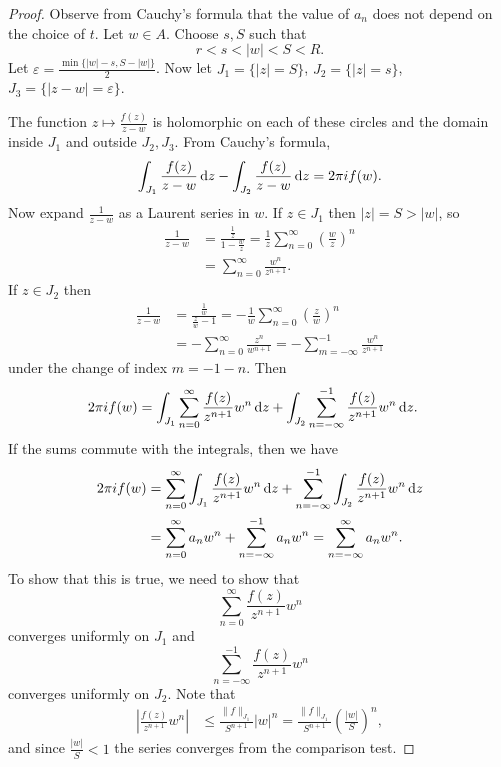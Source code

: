 \begin{proof}
Observe from Cauchy's formula
that the value of $a_n$ does not depend on the choice of $t$.
Let $w \in A$. Choose $s, S$ such that
$$
r < s < |w| < S < R.
$$
Let $\varepsilon = \frac{\min \{ |w| - s, S - |w| \}}{2}$.
Now let $J_1 = \{ |z| = S \}$, $J_2 = \{ |z| = s \}$,
$J_3 = \{ |z - w| = \varepsilon \}$.

The function $z \mapsto \frac{f(z)}{z - w}$ is holomorphic
on each of these circles and the domain inside $J_1$
and outside $J_2, J_3$. From Cauchy's formula,
$$
  \int_{J_1}
    \frac{f(z)}
         {z - w}
    \mathop{}\!\mathrm{d} z
- \int_{J_2}
    \frac{f(z)}
         {z - w}
    \mathop{}\!\mathrm{d} z
= 2 \pi i f(w).
$$
Now expand $\frac{1}{z - w}$ as a Laurent series
in $w$. If $z \in J_1$ then $|z| = S > |w|$, so
\begin{align*}
   \frac{1}{z - w}
&= \frac{\frac{1}{z}}
        {1 - \frac{w}{z}}
 = \frac{1}{z}
   \sum_{n=0}^\infty
     \left(
       \frac{w}{z}
     \right)^n \\
&= \sum_{n=0}^\infty
     \frac{w^n}{z^{n+1}}.
\end{align*}
If $z \in J_2$ then
\begin{align*}
   \frac{1}{z - w}
&= \frac{\frac{1}{w}}
        {\frac{z}{w} - 1}
 = -\frac{1}{w}
    \sum_{n=0}^\infty
      \left(
        \frac{z}{w}
      \right)^n \\
&= -\sum_{n=0}^\infty
      \frac{z^n}{w^{n+1}}
 = -\sum_{m=-\infty}^{-1} \frac{w^n}{z^{n+1}}
\end{align*}
under the change of index $m =-1 - n$.
Then
\begin{align*}
   2 \pi i f(w)
&= \int_{J_1}
     \sum_{n=0}^\infty
       \frac{f(z)}
            {z^{n+1}}
       w^n
       \mathop{}\!\mathrm{d} z
 + \int_{J_2}
     \sum_{n=-\infty}^{-1}
       \frac{f(z)}
            {z^{n+1}}
       w^n
       \mathop{}\!\mathrm{d} z.
\end{align*}
If the sums commute with the integrals, then
we have
\begin{align*}
2 \pi i f(w)
&= \sum_{n=0}^\infty
     \int_{J_1}
       \frac{f(z)}
            {z^{n+1}}
       w^n
       \mathop{}\!\mathrm{d} z
 + \sum_{n=-\infty}^{-1}
     \int_{J_2}
       \frac{f(z)}
            {z^{n+1}}
       w^n
       \mathop{}\!\mathrm{d} z \\
&= \sum_{n=0}^\infty
     a_n w^n
 + \sum_{n=-\infty}^{-1}
     a_n w^n
 = \sum_{n=-\infty}^\infty a_n w^n.
\end{align*}
To show that this is true, we need to show that
$$
\sum_{n=0}^\infty \frac{f(z)}{z^{n+1}} w^n
$$
converges uniformly on $J_1$ and
$$
\sum_{n=-\infty}^{-1} \frac{f(z)}{z^{n+1}} w^n
$$
converges uniformly on $J_2$. Note that
\begin{align*}
      \left|
        \frac{f(z)}{z^{n+1}} w^n
      \right|
&\leq \frac{\| f \|_{J_1}}
           {S^{n+1}}
      |w|^n
 =    \frac{\| f \|_{J_1}}
           {S^{n+1}}
      \left(
        \frac{|w|}{S}
      \right)^n,
\end{align*}
and since $\frac{|w|}{S} < 1$ the series converges
from the comparison test.


\end{proof}
